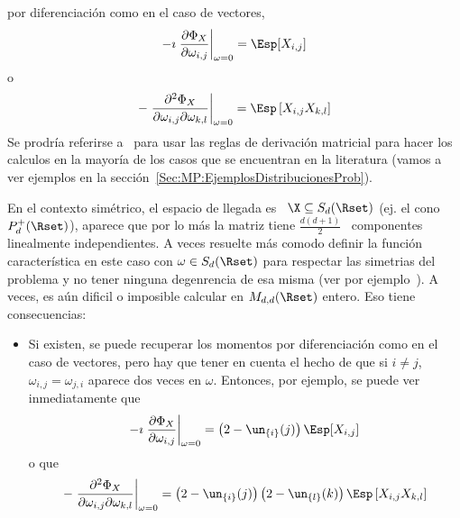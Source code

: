 \begin{itemize}
  por  diferenciaci\'on   como  en  el  caso  de   vectores,
  \[
  -\imath \left. \frac{\partial \Phi_X}{\partial \omega_{i,j}} \right|_{\omega =
    0} = \Esp[X_{i,j}]
  \]
  o
  \[
  - \left. \frac{\partial^2 \Phi_X}{\partial \omega_{i,j} \partial \omega_{k,l}}
  \right|_{\omega = 0} = \Esp\left[ X_{i,j} X_{k,l} \right]
  \]
  Se  prodr\'ia  referirse a~\cite[Cap.~8]{MagNeu99}  para  usar  las reglas  de
  derivaci\'on matricial  para hacer los calculos  en la mayor\'ia  de los casos
  que   se  encuentran  en   la  literatura   (vamos  a   ver  ejemplos   en  la
  secci\'on~\ref{Sec:MP:EjemplosDistribucionesProb}).
\end{itemize}





\label{Sssec:MP:MatricesAleatoriasSimetrico}

En  el  contexto  sim\'etrico, \ie  el  espacio  de  llegada  es \  $\X  \subseteq
S_d(\Rset)$ (ej.   el cono $P_d^+(\Rset)$), aparece  que por lo  m\'as la matriz
tiene  $\frac{d (d+1)}{2}$  \  componentes linealmente  independientes. A  veces
resuelte m\'as  comodo definir  la funci\'on caracter\'istica  en este  caso con
$\omega \in  S_d(\Rset)$ para  respectar las simetrias  del problema y  no tener
ninguna degenrencia  de esa misma  (ver por ejemplo~\cite{PedRic91,  And03}).  A
veces, es a\'un  dificil o imposible calcular en  $\\M_{d,d}(\Rset)$ entero. Eso
tiene consecuencias:
%
\begin{itemize}
\item Si existen,  se puede recuperar los momentos  por diferenciaci\'on como en
  el caso de  vectores, pero hay que tener  en cuenta el hecho de que  si $i \ne
  j$, $\omega_{i,j} = \omega_{j,i}$ aparece dos veces en $\omega$. Entonces, por
  ejemplo, se puede ver inmediatamente que
  \[
  -\imath \left. \frac{\partial \Phi_X}{\partial \omega_{i,j}} \right|_{\omega =
    0} = \left( 2 - \un_{\{i\}}(j) \right) \Esp[X_{i,j}]
  \]
  o que
  \[
  - \left. \frac{\partial^2 \Phi_X}{\partial \omega_{i,j} \partial \omega_{k,l}}
  \right|_{\omega  =  0}  =  \left(  2  -  \un_{\{i\}}(j)  \right)  \left(  2  -
    \un_{\{l\}}(k) \right) \Esp\left[ X_{i,j} X_{k,l} \right]
  \]
\end{itemize}

